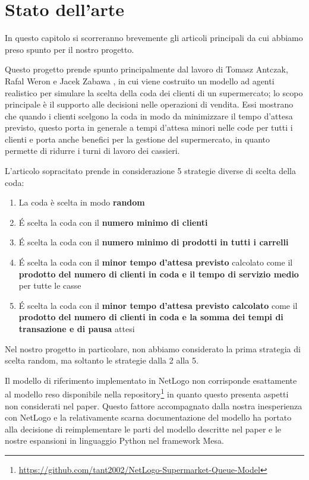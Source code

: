 \chapter{Stato dell'arte}
\label{chapter:sota}

In questo capitolo si scorreranno brevemente gli articoli principali da cui abbiamo preso spunto per il nostro progetto. 

\vspace*{1\baselineskip}

Questo progetto prende spunto principalmente dal lavoro di Tomasz Antczak, Rafal Weron e Jacek Zabawa \cite{article1}, in cui viene costruito un modello ad agenti realistico per simulare la scelta della coda dei clienti di un supermercato; lo scopo principale è il supporto alle decisioni nelle operazioni di vendita. Essi mostrano che quando i clienti scelgono la coda in modo da minimizzare il tempo d'attesa previsto, questo porta in generale a tempi d'attesa minori nelle code per tutti i clienti e porta anche benefici per la gestione del supermercato, in quanto permette di ridurre i turni di lavoro dei cassieri.

L'articolo sopracitato prende in considerazione 5 strategie diverse di scelta della coda:

\begin{enumerate}
	\item La coda è scelta in modo \textbf{random}
	\item \'E scelta la coda con il\textbf{ numero minimo di clienti}
	\item \'E scelta la coda con il\textbf{ numero minimo di prodotti in tutti i carrelli}
	\item \'E scelta la coda con il\textbf{ minor tempo d'attesa previsto }calcolato come il \textbf{prodotto del numero di clienti in coda e il tempo di servizio medio }per tutte le casse
	\item \'E scelta la coda con il \textbf{minor tempo d'attesa previsto calcolato }come il \textbf{prodotto del numero di clienti in coda e la somma dei tempi di transazione e di pausa }attesi
\end{enumerate}

Nel nostro progetto in particolare, non abbiamo considerato la prima
strategia di scelta random, ma soltanto le strategie dalla 2 alla 5.

Il modello di riferimento \cite{article1} implementato in NetLogo non
corrisponde esattamente al modello reso disponibile nella repository\footnote{\protect\url{https://github.com/tant2002/NetLogo-Supermarket-Queue-Model}} in
quanto questo presenta aspetti non considerati nel paper. Questo
fattore accompagnato dalla nostra inesperienza con NetLogo e la
relativamente scarna documentazione del modello ha portato alla
decisione di reimplementare le parti del modello descritte nel paper
\cite{article1} e le nostre espansioni in linguaggio Python nel
framework Mesa.


